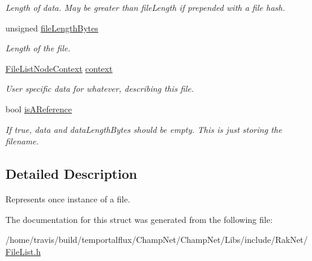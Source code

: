 \begin{DoxyCompactItemize}
\begin{DoxyCompactList}\small\item\em Length of {\itshape data}. May be greater than file\-Length if prepended with a file hash. \end{DoxyCompactList}\item 
\hypertarget{struct_rak_net_1_1_file_list_node_a210cd8072160d33b4bfd7e16fe44c302}{unsigned \hyperlink{struct_rak_net_1_1_file_list_node_a210cd8072160d33b4bfd7e16fe44c302}{file\-Length\-Bytes}}\label{struct_rak_net_1_1_file_list_node_a210cd8072160d33b4bfd7e16fe44c302}

\begin{DoxyCompactList}\small\item\em Length of the file. \end{DoxyCompactList}\item 
\hypertarget{struct_rak_net_1_1_file_list_node_a8966525bea5a3f3a47f42957481d1e73}{\hyperlink{struct_file_list_node_context}{File\-List\-Node\-Context} \hyperlink{struct_rak_net_1_1_file_list_node_a8966525bea5a3f3a47f42957481d1e73}{context}}\label{struct_rak_net_1_1_file_list_node_a8966525bea5a3f3a47f42957481d1e73}

\begin{DoxyCompactList}\small\item\em User specific data for whatever, describing this file. \end{DoxyCompactList}\item 
\hypertarget{struct_rak_net_1_1_file_list_node_acf7bd656e80e80154e626a96169fe0ed}{bool \hyperlink{struct_rak_net_1_1_file_list_node_acf7bd656e80e80154e626a96169fe0ed}{is\-A\-Reference}}\label{struct_rak_net_1_1_file_list_node_acf7bd656e80e80154e626a96169fe0ed}

\begin{DoxyCompactList}\small\item\em If true, data and data\-Length\-Bytes should be empty. This is just storing the filename. \end{DoxyCompactList}\end{DoxyCompactItemize}


\subsection{Detailed Description}
Represents once instance of a file. 

The documentation for this struct was generated from the following file\-:\begin{DoxyCompactItemize}
\item 
/home/travis/build/temportalflux/\-Champ\-Net/\-Champ\-Net/\-Libs/include/\-Rak\-Net/\hyperlink{_file_list_8h}{File\-List.\-h}\end{DoxyCompactItemize}

